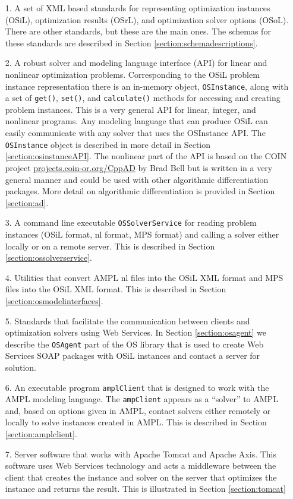 \documentclass[11pt]{article}
\renewcommand{\_}{{\char"5F}}
\renewcommand{\{}{{\char"7B}}
\renewcommand{\}}{{\char"7D}}
\renewcommand{\^}{{\char"0D}}
\renewcommand{\'}{{\char"0D}}
\begin{document}
\begin{itemize}
\item[1.]  A set of XML based standards for representing optimization instances (OSiL), optimization results (OSrL), and optimization solver options (OSoL). There are other standards, but these are the main ones. The schemas for these standards are described in Section   \ref{section:schemadescriptions}.

\item[2.]  A robust solver and modeling language interface (API) for linear and nonlinear optimization problems.  Corresponding to the OSiL problem instance representation there is an in-memory object,  {\tt OSInstance}, along with a set of  {\tt get()},   {\tt set()}, and {\tt calculate()} methods for accessing and creating problem instances.  
This is a very general API for linear, integer, and nonlinear programs.  Any modeling language that can produce OSiL can easily communicate with any solver that uses the OSInstance API.   The {\tt OSInstance} object is described in more detail in Section \ref{section:osinstanceAPI}. The nonlinear part of the API is based on the COIN project \url{projects.coin-or.org/CppAD} by Brad Bell but is written in a very general manner and could be used with other algorithmic differentiation packages. More detail on algorithmic differentiation is provided in Section \ref{section:ad}.


\item[3.]  A  command line executable {\tt OSSolverService}  for reading problem instances (OSiL format, nl format, MPS format) and calling a solver either locally or on a remote server.  This is described in Section \ref{section:ossolverservice}.


\item[4.] Utilities that convert AMPL nl files into the OSiL XML format and MPS files into the OSiL XML format.  This is described in Section \ref{section:osmodelinterfaces}.


\item[5.]  Standards that facilitate the communication between clients and optimization solvers using Web Services.  In  Section \ref{section:osagent} we describe the {\tt OSAgent} part of the OS library that is used to create Web Services
 SOAP packages with OSiL instances and contact a server for solution. 

\item[6.]  An executable program {\tt amplClient} that is designed to work with the AMPL modeling language. The {\tt ampClient} appears as a ``solver'' to AMPL and, based on options given in AMPL, contact solvers either remotely or locally to solve instances created in AMPL. This is described in Section \ref{section:amplclient}.

\item[7.]  Server software that works with Apache Tomcat and Apache Axis.  
This software uses Web Services technology and acts a middleware between the client that creates the instance and solver on the server that optimizes the instance and returns the result. This is illustrated in Section  \ref{section:tomcat}
\end{itemize}
\end{document}
